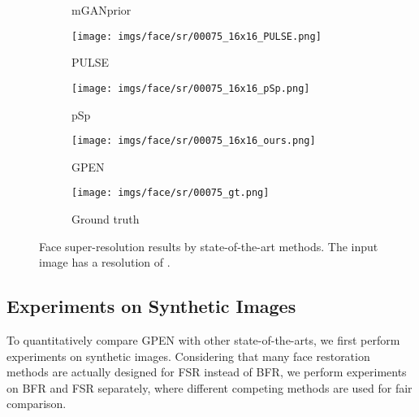 \documentclass[final]{cvpr}
\begin{document}
\begin{figure*}[ht!]
\begin{subfigure}[t!]{.16\textwidth}
        \caption{mGANprior }
    \end{subfigure} 
    \begin{subfigure}[t!]{.16\textwidth}
        \texttt{[image: imgs/face/sr/00075\_16x16\_PULSE.png]}
        \vspace*{-5mm}
        \caption{PULSE }
    \end{subfigure} 
    \begin{subfigure}[t!]{.16\textwidth}
        \texttt{[image: imgs/face/sr/00075\_16x16\_pSp.png]}
        \vspace*{-5mm}
        \caption{pSp }
    \end{subfigure} 
    \begin{subfigure}[t!]{.16\textwidth}
        \texttt{[image: imgs/face/sr/00075\_16x16\_ours.png]}
        \vspace*{-5mm}
        \caption{GPEN}
    \end{subfigure} 
    \begin{subfigure}[t!]{.16\textwidth}
        \texttt{[image: imgs/face/sr/00075\_gt.png]}
        \vspace*{-5mm}
        \caption{Ground truth}
    \end{subfigure} 
\vspace*{-1mm}
\caption{Face super-resolution results by state-of-the-art methods. The input image has a resolution of .}
\label{fig:fsr16}
\vspace*{-3mm}
\end{figure*}



















\subsection{Experiments on Synthetic Images}
To quantitatively compare GPEN with other state-of-the-arts, we first perform experiments on synthetic images. Considering that many face restoration methods \cite{Gu2019Prior,Menon2020PULSE,Richardson2020pSp} are actually designed for FSR instead of BFR, we perform experiments on BFR and FSR separately, where different competing methods are used for fair comparison. 
\end{document}
